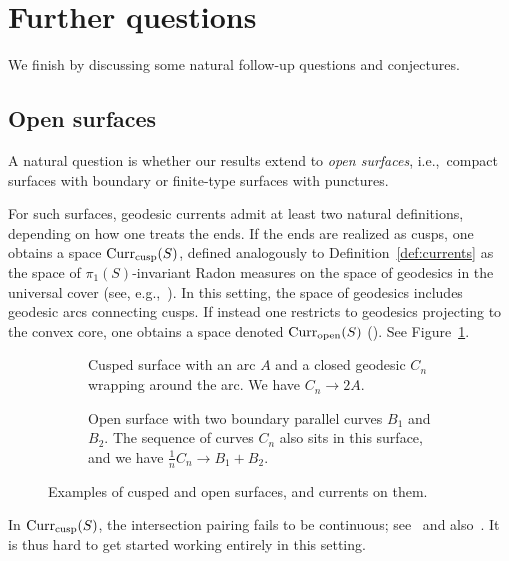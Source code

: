 \section{Further questions}
\label{sec:questions}

We finish by discussing some natural follow-up questions and conjectures.

\subsection{Open surfaces}
A natural question is whether our results extend to \emph{open surfaces}, i.e.,\ compact surfaces with boundary or finite-type surfaces with punctures.

For such surfaces, geodesic currents admit at least two natural definitions, depending on how one treats the ends. 
If the ends are realized as cusps, one obtains a space $\operatorname{Curr}_{\mathrm{cusp}}(S)$, defined analogously to Definition~\ref{def:currents} as the space of $\pi_1(S)$-invariant 
Radon measures on the space of geodesics in the universal cover (see, e.g.,~\cite[Definition~2.2]{Sas22:Currents}). In this setting, the space of geodesics includes geodesic arcs connecting cusps. 
If instead one restricts to geodesics projecting to the convex core,
one obtains a space denoted $\operatorname{Curr}_{\mathrm{open}}(S)$ (\cite[Section~2.6]{DLR10:DegenerationFlatMetrics}). See
Figure~\ref{fig:open_surfaces}.

\begin{figure}
\centering
\begin{subfigure}{0.48\textwidth}
\centering
{}
\caption{Cusped surface with an arc $A$ and a closed geodesic $C_n$
  wrapping around the arc. We have $C_n \to 2A$.}
\end{subfigure}
\hfill
\begin{subfigure}{0.48\textwidth}
\centering
{}
\caption{Open surface with two boundary parallel curves $B_1$ and $B_2$. The sequence of curves $C_n$ also sits in this surface, and we have $\frac{1}{n}C_n \to B_1 + B_2$.}
\end{subfigure}
\caption{Examples of cusped and open surfaces, and currents on them.}
\label{fig:open_surfaces}
\end{figure}

In $\operatorname{Curr}_{\mathrm{cusp}}(S)$, the intersection pairing fails to be
continuous; see~\cite[Remark~2.26]{MGT21:Smoothings} and
also~\cite{Sas22:Currents, T22:ThurstonCompactification}. It is thus
hard to get started working entirely in this setting.


